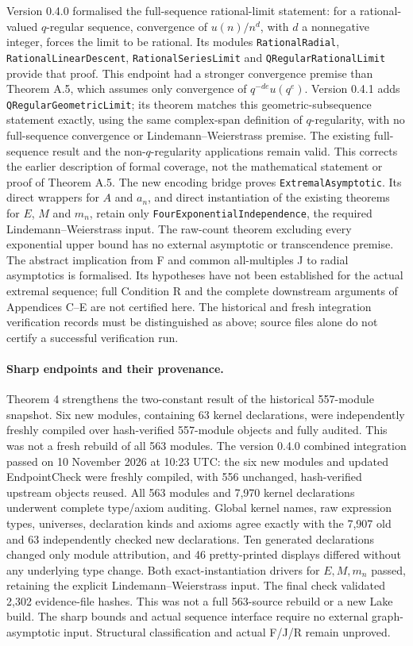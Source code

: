 \documentclass[11pt]{article}
\begin{document}
Version 0.4.0 formalised the full-sequence rational-limit statement: for a rational-valued $q$-regular sequence, convergence of $u(n)/n^d$, with $d$ a nonnegative integer, forces the limit to be rational. Its modules \texttt{RationalRadial}, \texttt{RationalLinearDescent}, \texttt{RationalSeriesLimit} and \texttt{QRegularRationalLimit} provide that proof. This endpoint had a stronger convergence premise than Theorem A.5, which assumes only convergence of $q^{-de}u(q^e)$. Version 0.4.1 adds \texttt{QRegularGeometricLimit}; its theorem  matches this geometric-subsequence statement exactly, using the same complex-span definition of $q$-regularity, with no full-sequence convergence or Lindemann--Weierstrass premise. The existing full-sequence result and the non-$q$-regularity applications remain valid. This corrects the earlier description of formal coverage, not the mathematical statement or proof of Theorem A.5. The new encoding bridge proves \texttt{ExtremalAsymptotic}. Its direct wrappers for $A$ and $a_n$, and direct instantiation of the existing theorems for $E$, $M$ and $m_n$, retain only \texttt{FourExponentialIndependence}, the required Lindemann--Weierstrass input. The raw-count theorem excluding every exponential upper bound has no external asymptotic or transcendence premise. The abstract implication from F and common all-multiples J to radial asymptotics is formalised. Its hypotheses have not been established for the actual extremal sequence; full Condition R and the complete downstream arguments of Appendices C--E are not certified here. The historical and fresh integration verification records must be distinguished as above; source files alone do not certify a successful verification run.

\paragraph{Sharp endpoints and their provenance.} Theorem 4 strengthens the two-constant result of the historical 557-module snapshot. Six new modules, containing 63 kernel declarations, were independently freshly compiled over hash-verified 557-module objects and fully audited. This was not a fresh rebuild of all 563 modules. The version 0.4.0 combined integration passed on 10 November 2026 at 10:23 UTC: the six new modules and updated EndpointCheck were freshly compiled, with 556 unchanged, hash-verified upstream objects reused. All 563 modules and 7,970 kernel declarations underwent complete type/axiom auditing. Global kernel names, raw expression types, universes, declaration kinds and axioms agree exactly with the 7,907 old and 63 independently checked new declarations. Ten generated declarations changed only module attribution, and 46 pretty-printed displays differed without any underlying type change. Both exact-instantiation drivers for $E,M,m_n$ passed, retaining the explicit Lindemann--Weierstrass input. The final check validated 2,302 evidence-file hashes. This was not a full 563-source rebuild or a new Lake build. The sharp bounds and actual sequence interface require no external graph-asymptotic input. Structural classification and actual F/J/R remain unproved.
\end{document}
